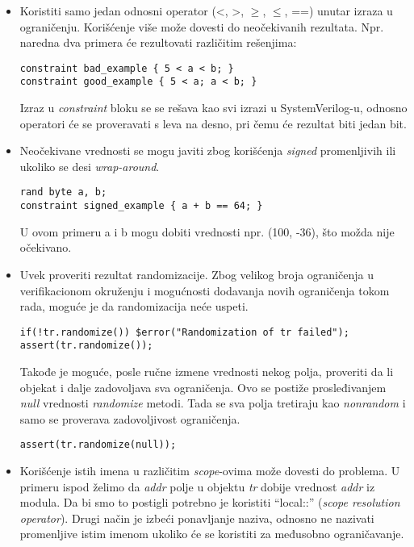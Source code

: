 \begin{itemize}
\item Koristiti samo jedan odnosni operator (\textless, \textgreater , \(\geq\),
  \(\leq\), ==) unutar izraza u ograničenju. Korišćenje više može dovesti do
  neočekivanih rezultata. Npr. naredna dva primera će rezultovati različitim
  rešenjima:
  \begin{lstlisting}
constraint bad_example { 5 < a < b; }
constraint good_example { 5 < a; a < b; }
\end{lstlisting}
  Izraz u \emph{constraint} bloku se se rešava kao svi izrazi u SystemVerilog-u,
  odnosno operatori će se proveravati s leva na desno, pri čemu će rezultat biti
  jedan bit.

\item Neočekivane vrednosti se mogu javiti zbog korišćenja \emph{signed}
  promenljivih ili ukoliko se desi \emph{wrap-around}.
  \begin{lstlisting}
rand byte a, b;
constraint signed_example { a + b == 64; }
\end{lstlisting}
  U ovom primeru a i b mogu dobiti vrednosti npr. (100, -36), što možda nije
  očekivano.

\item Uvek proveriti rezultat randomizacije. Zbog velikog broja ograničenja u
  verifikacionom okruženju i mogućnosti dodavanja novih ograničenja tokom rada,
  moguće je da randomizacija neće uspeti.
  \begin{lstlisting}
if(!tr.randomize()) $error("Randomization of tr failed");
assert(tr.randomize());
\end{lstlisting}
  Takođe je moguće, posle ručne izmene vrednosti nekog polja, proveriti da li
  objekat i dalje zadovoljava sva ograničenja. Ovo se postiže prosleđivanjem
  \emph{null} vrednosti \emph{randomize} metodi. Tada se sva polja tretiraju kao
  \emph{nonrandom} i samo se proverava zadovoljivost ograničenja.
  \begin{lstlisting}
assert(tr.randomize(null));
\end{lstlisting}

\item Korišćenje istih imena u različitim \emph{scope}-ovima može dovesti do
  problema. U primeru ispod želimo da \emph{addr} polje u objektu \emph{tr}
  dobije vrednost \emph{addr} iz modula. Da bi smo to postigli potrebno je
  koristiti ``local::'' (\emph{scope resolution operator}).
  Drugi način je izbeći ponavljanje naziva, odnosno ne nazivati promenljive
  istim imenom ukoliko će se koristiti za međusobno ograničavanje.



\end{itemize}

